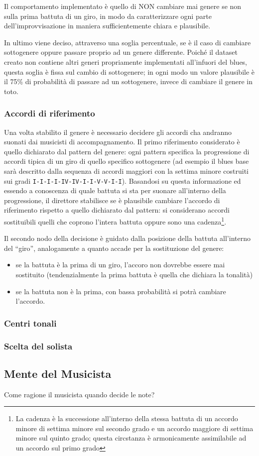 Il comportamento implementato è quello di NON cambiare mai genere se non sulla prima battuta di un giro, in modo da caratterizzare ogni parte dell'improvvisazione in maniera sufficientemente chiara e plausibile. 

In ultimo viene deciso, attraverso una soglia percentuale, se è il caso di cambiare sottogenere oppure passare proprio ad un genere differente.
Poiché il dataset creato non contiene altri generi propriamente implementati all'infuori del blues, questa soglia è fissa sul cambio di sottogenere; in ogni modo un valore plausibile è il 75\% di probabilità di passare ad un sottogenere, invece di cambiare il genere in toto.

\subsubsection{Accordi di riferimento}
Una volta stabilito il genere è necessario decidere gli accordi cha andranno suonati dai musicisti di accompagnamento.
Il primo riferimento considerato è quello dichiarato dal pattern del genere: ogni pattern specifica la progressione di accordi tipica di un giro di quello specifico sottogenere (ad esempio il blues base sarà descritto dalla sequenza di accordi maggiori con la settima minore costruiti sui gradi \texttt{I-I-I-I-IV-IV-I-I-V-V-I-I}).
Basandosi su questa informazione ed essendo a conoscenza di quale battuta si sta per suonare all'interno della progressione, il direttore stabilisce se è plausibile cambiare l'accordo di riferimento rispetto a quello dichiarato dal pattern: si considerano accordi sostituibili quelli che coprono l'intera battuta oppure sono una cadenza\footnote{La cadenza è la successione all'interno della stessa battuta di un accordo minore di settima minore sul secondo grado e un accordo maggiore di settima minore sul quinto grado; questa circstanza è armonicamente assimilabile ad un accordo sul primo grado}.

Il secondo nodo della decisione è guidato dalla posizione della battuta all'interno del ``giro'', analogamente a quanto accade per la sostituzione del genere:
\begin{itemize}
\item se la battuta è la prima di un giro, l'accoro non dovrebbe essere mai sostituito (tendenzialmente la prima battuta è quella che dichiara la tonalità)
\item se la battuta non è la prima, con bassa probabilità si potrà cambiare l'accordo.
\end{itemize}



\subsubsection{Centri tonali}

\subsubsection{Scelta del solista}


\subsection{Mente del Musicista}
Come ragione il musicista quando decide le note?
